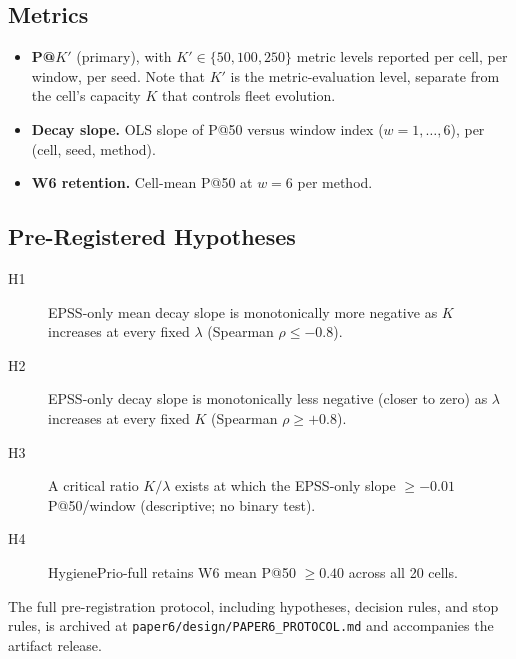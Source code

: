 \subsection{Metrics}

\begin{itemize}
\item \textbf{P@$K'$} (primary), with $K' \in \{50, 100, 250\}$
metric levels reported per cell, per window, per seed. Note that $K'$
is the metric-evaluation level, separate from the cell's capacity $K$
that controls fleet evolution.
\item \textbf{Decay slope.} OLS slope of P@50 versus window index
($w = 1, \ldots, 6$), per (cell, seed, method).
\item \textbf{W6 retention.} Cell-mean P@50 at $w = 6$ per method.
\end{itemize}

\subsection{Pre-Registered Hypotheses}

\begin{description}
\item[H1] EPSS-only mean decay slope is monotonically more negative as
$K$ increases at every fixed $\lambda$ (Spearman $\rho \leq -0.8$).
\item[H2] EPSS-only decay slope is monotonically less negative (closer
to zero) as $\lambda$ increases at every fixed $K$ (Spearman $\rho \geq +0.8$).
\item[H3] A critical ratio $K/\lambda$ exists at which the EPSS-only
slope $\geq -0.01$ P@50/window (descriptive; no binary test).
\item[H4] HygienePrio-full retains W6 mean P@50 $\geq 0.40$ across all
20 cells.
\end{description}

The full pre-registration protocol, including hypotheses, decision
rules, and stop rules, is archived at \texttt{paper6/design/PAPER6\_PROTOCOL.md}
and accompanies the artifact release.
